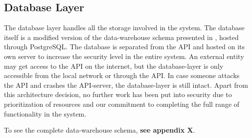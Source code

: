 \subsection{Database Layer}\label{subsec:dblayer}
The database layer handles all the storage involved in the system. The database itself is a modified version of the data-warehouse schema presented in \cite{sw9_report}, hosted through PostgreSQL\cite{postgresql}. The database is separated from the API and hosted on its own server to increase the security level in the entire system. An external entity may get access to the API on the internet, but the database-layer is only accessible from the local network or through the API. In case someone attacks the API and crashes the API-server, the database-layer is still intact. Apart from this architecture decision, no further work has been put into security due to prioritization of resources and our commitment to completing the full range of functionality in the system. 

To see the complete data-warehouse schema, \textbf{see appendix X}.
